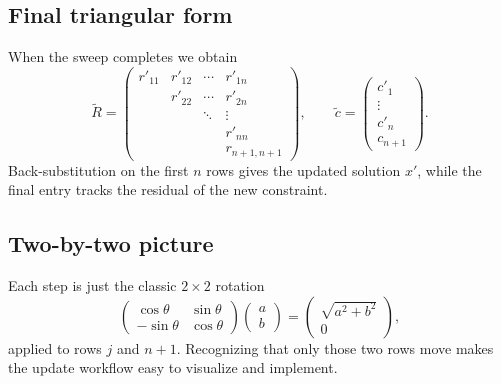 \documentclass[letterpaper, 12pt]{article}
\begin{document}
\subsection*{Final triangular form}

When the sweep completes we obtain
\[
    	\tilde{R} = \begin{pmatrix}
        r'_{11} & r'_{12} & \cdots & r'_{1n} \\
                 & r'_{22} & \cdots & r'_{2n} \\
                 &         & \ddots & \vdots \\
                 &         &        & r'_{nn} \\
                 &         &        & r_{n+1,n+1}
    \end{pmatrix},
    \qquad
    	\tilde{c} = \begin{pmatrix}
        c'_1 \\
        \vdots \\
        c'_n \\
        c_{n+1}
    \end{pmatrix}.
\]
Back-substitution on the first $n$ rows gives the updated solution $x'$, while the final entry tracks the residual of the new constraint.

\subsection*{Two-by-two picture}

Each step is just the classic $2\times 2$ rotation
\[
    \begin{pmatrix}
        \cos \theta & \sin \theta \\
        -\sin \theta & \cos \theta
    \end{pmatrix}
    \begin{pmatrix}
        a \\
        b
    \end{pmatrix}
    =
    \begin{pmatrix}
        \sqrt{a^2 + b^2} \\
        0
    \end{pmatrix},
\]
applied to rows $j$ and $n+1$. Recognizing that only those two rows move makes the update workflow easy to visualize and implement.
\end{document}
